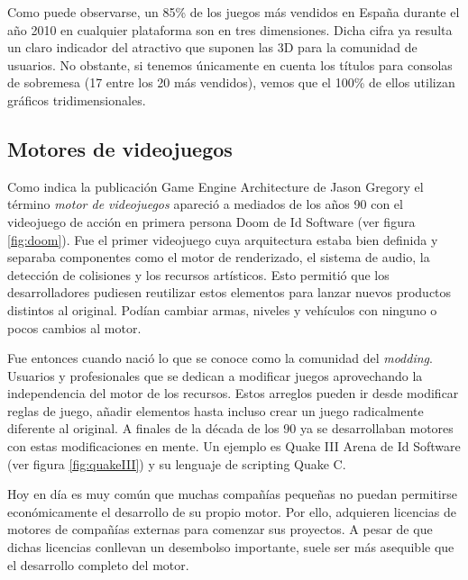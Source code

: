 Como puede observarse, un 85\% de los juegos más vendidos en España durante
el año 2010 en cualquier plataforma son en tres dimensiones. Dicha cifra ya
resulta un claro indicador del atractivo que suponen las 3D para la comunidad
de usuarios. No obstante, si tenemos únicamente en cuenta los títulos para
consolas de sobremesa (17 entre los 20 más vendidos), vemos que el 100\%
de ellos utilizan gráficos tridimensionales.\\


\subsection{Motores de videojuegos}

Como indica la publicación Game Engine Architecture de Jason Gregory
\cite{greg09} el término \emph{motor de videojuegos} apareció a mediados
de los años 90 con el videojuego de acción en primera persona Doom
\cite{website:doom} de Id Software (ver figura \ref{fig:doom}). Fue el
primer videojuego cuya arquitectura estaba bien definida y separaba
componentes como el motor de renderizado, el sistema de audio, la detección
de colisiones y los recursos artísticos. Esto permitió que los desarrolladores
pudiesen reutilizar estos elementos para lanzar nuevos productos distintos
al original. Podían cambiar armas, niveles y vehículos con ninguno o
pocos cambios al motor.\\


Fue entonces cuando nació lo que se conoce como la comunidad del \emph{modding}.
Usuarios y profesionales que se dedican a modificar juegos aprovechando
la independencia del motor de los recursos. Estos arreglos pueden ir desde
modificar reglas de juego, añadir elementos hasta incluso crear un juego
radicalmente diferente al original. A finales de la década de los 90
ya se desarrollaban motores con estas modificaciones en mente. Un ejemplo
es Quake III Arena \cite{website:quakeIII} de Id Software (ver figura
\ref{fig:quakeIII}) y su lenguaje de scripting Quake C.\\


Hoy en día es muy común que muchas compañías pequeñas no puedan permitirse
económicamente el desarrollo de su propio motor. Por ello, adquieren licencias
de motores de compañías externas para comenzar sus proyectos. A pesar de que
dichas licencias conllevan un desembolso importante, suele ser más asequible
que el desarrollo completo del motor.\\

